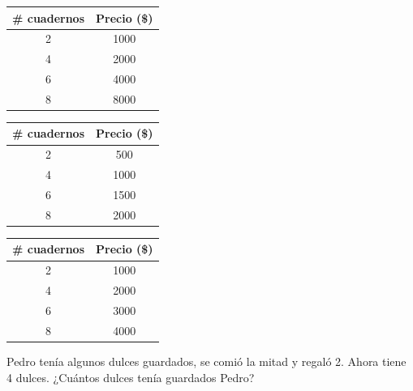 \documentclass[10pt,addpoints]{exam}
\begin{document}
\begin{multicols}{2}
\begin{questions}
\begin{choices}
\choice \begin{tabular}{|c|c|}
\hline 
\# cuadernos & Precio (\$) \\ 
\hline 
2 & 1000 \\ 
\hline 
4 & 2000 \\ 
\hline 
6 & 4000 \\ 
\hline 
8 & 8000 \\ 
\hline 
\end{tabular}
\choice \begin{tabular}{|c|c|}
\hline 
\# cuadernos & Precio (\$) \\ 
\hline 
2 & 500 \\ 
\hline 
4 & 1000 \\ 
\hline 
6 & 1500 \\ 
\hline 
8 & 2000 \\ 
\hline 
\end{tabular} 
\CorrectChoice \begin{tabular}{|c|c|}
\hline 
\# cuadernos & Precio (\$) \\ 
\hline 
2 & 1000 \\ 
\hline 
4 & 2000 \\ 
\hline 
6 & 3000 \\ 
\hline 
8 & 4000 \\ 
\hline 
\end{tabular} 
\end{choices}
\question Pedro tenía algunos dulces guardados, se comió la mitad y regaló 2. Ahora tiene 4 dulces. ¿Cuántos dulces tenía guardados Pedro?


\end{questions}
\end{multicols}
\end{document}
